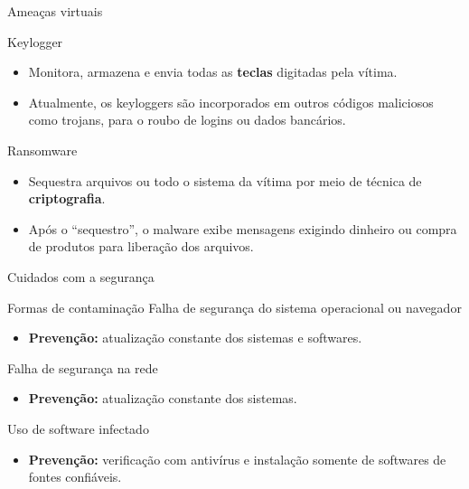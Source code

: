 \begin{frame}{Ameaças virtuais}
	\begin{block}{Keylogger}
		\begin{itemize}
			\item Monitora, armazena e envia todas as \textbf{teclas} digitadas pela vítima.
			\item Atualmente, os keyloggers são incorporados em outros códigos maliciosos como trojans, para o roubo de logins ou dados bancários.
		\end{itemize}
	\end{block}

	\begin{block}{Ransomware}
		\begin{itemize}
			\item Sequestra arquivos ou todo o sistema da vítima por meio de técnica de \textbf{criptografia}.
			\item Após o “sequestro”, o malware exibe mensagens exigindo dinheiro ou compra de produtos para liberação dos arquivos.
		\end{itemize}
	\end{block}
\end{frame}


\begin{frame}{Cuidados com a segurança}
	\begin{block}{Formas de contaminação}
		Falha de segurança do sistema operacional ou navegador
		\begin{itemize}
			\item \textbf{Prevenção:} atualização constante dos sistemas e softwares.
		\end{itemize}
		Falha de segurança na rede
		\begin{itemize}
			\item \textbf{Prevenção:} atualização constante dos sistemas.
		\end{itemize}
		Uso de software infectado
		\begin{itemize}
			\item \textbf{Prevenção:} verificação com antivírus e instalação somente de softwares de fontes confiáveis.
		\end{itemize}
	\end{block}
\end{frame}


